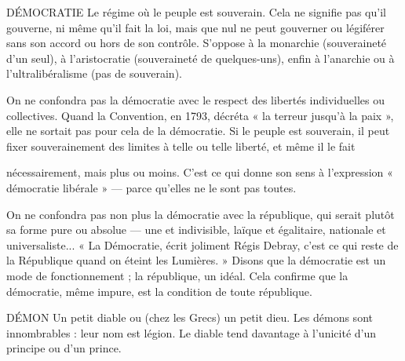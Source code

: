 DÉMOCRATIE Le régime où le peuple est souverain. Cela ne signifie pas
qu’il gouverne, ni même qu’il fait la loi, mais que nul ne
peut gouverner ou légiférer sans son accord ou hors de son contrôle. S’oppose
à la monarchie (souveraineté d’un seul), à l’aristocratie (souveraineté de
quelques-uns), enfin à l'anarchie ou à l’ultralibéralisme (pas de souverain).

On ne confondra pas la démocratie avec le respect des libertés individuelles
ou collectives. Quand la Convention, en 1793, décréta « la terreur jusqu’à la
paix », elle ne sortait pas pour cela de la démocratie. Si le peuple est souverain,
il peut fixer souverainement des limites à telle ou telle liberté, et même il le fait

nécessairement, mais plus ou moins. C’est ce qui donne son sens à l'expression
« démocratie libérale » — parce qu’elles ne le sont pas toutes.

On ne confondra pas non plus la démocratie avec la république, qui serait
plutôt sa forme pure ou absolue — une et indivisible, laïque et égalitaire, nationale
et universaliste... « La Démocratie, écrit joliment Régis Debray, c’est ce
qui reste de la République quand on éteint les Lumières. » Disons que la démocratie
est un mode de fonctionnement ; la république, un idéal. Cela confirme
que la démocratie, même impure, est la condition de toute république.

DÉMON Un petit diable ou (chez les Grecs) un petit dieu. Les démons sont
innombrables : leur nom est légion. Le diable tend davantage à
l'unicité d’un principe ou d’un prince.


